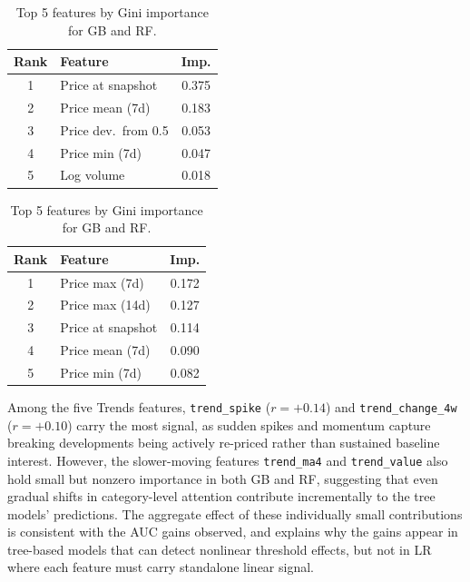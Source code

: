 \documentclass[11pt,twocolumn]{article}
\begin{document}
  \begin{table}[h]
  \centering
  \footnotesize
  \setlength{\tabcolsep}{3pt}
  \begin{minipage}{0.48\columnwidth}
      \centering
      \begin{tabular}{clc}
      \toprule
      Rank & Feature & Imp. \\
      \midrule
      1 & Price at snapshot    & 0.375 \\
      2 & Price mean (7d)      & 0.183 \\
      3 & Price dev.\ from 0.5 & 0.053 \\
      4 & Price min (7d)       & 0.047 \\
      5 & Log volume           & 0.018 \\
      \bottomrule
      \end{tabular}
      \caption*{\textbf{GB}: Top 5 Features}
  \end{minipage}
  \hfill
  \begin{minipage}{0.48\columnwidth}
      \centering
      \begin{tabular}{clc}
      \toprule
      Rank & Feature & Imp. \\
      \midrule
      1 & Price max (7d)    & 0.172 \\
      2 & Price max (14d)   & 0.127 \\
      3 & Price at snapshot & 0.114 \\
      4 & Price mean (7d)   & 0.090 \\
      5 & Price min (7d)    & 0.082 \\
      \bottomrule
      \end{tabular}
      \caption*{\textbf{RF}: Top 5 Features}
  \end{minipage}
  \caption{Top 5 features by Gini importance for GB and RF.}
  \label{tab:feature_importance}
  \end{table}

  Among the five Trends features, \texttt{trend\_spike} ($r = +0.14$)
  and \texttt{trend\_change\_4w} ($r = +0.10$) carry the most signal,
  as sudden spikes and momentum capture breaking developments being
  actively re-priced rather than sustained baseline interest. However,
  the slower-moving features \texttt{trend\_ma4} and
  \texttt{trend\_value} also hold small but nonzero importance in both
  GB and RF, suggesting that even gradual shifts in category-level
  attention contribute incrementally to the tree models' predictions.
  The aggregate effect of these individually small contributions is
  consistent with the AUC gains observed, and explains why the gains
  appear in tree-based models that can detect nonlinear threshold
  effects, but not in LR where each feature must carry standalone
  linear signal.
\end{document}
